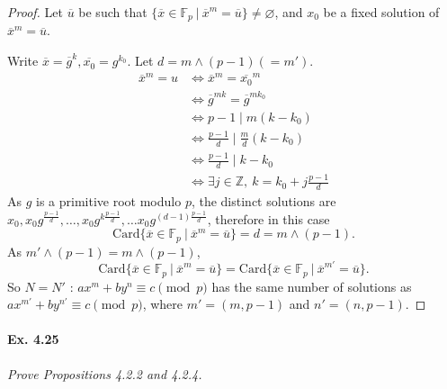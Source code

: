 \documentclass[11pt,a4paper]{article}
\newcommand{\Z}{\mathbb{Z}}
\newcommand{\F}{\mathbb{F}}
\begin{document}
\begin{proof}
Let $\overline{u}$ be such that $\{\overline{x} \in \F_p\ \vert\  \overline{x}^m  = \overline{u}\} \ne \varnothing$, and $x_0$ be a fixed solution of $\overline{x}^m  = \overline{u}$.

Write $\overline{x} = \overline{g}^k, \overline{x_0} = g^{k_0}$. Let $d = m\wedge (p-1) (=m')$.
\begin{align*}
\overline{x}^m = u &\iff \overline{x}^m = \overline{x_0}^m\\
&\iff \overline{g}^{mk} = \overline{g}^{mk_0}\\
&\iff  p-1 \mid m(k -k_0)\\
&\iff \frac{p-1}{d} \mid \frac{m}{d} (k-k_0)\\
&\iff \frac{p-1}{d} \mid k-k_0\\
&\iff \exists j \in \Z,\ k = k_0 + j \frac{p-1}{d} 
\end{align*}
As $g$ is a primitive root modulo $p$, the distinct solutions are $x_0, x_0 g^{\frac{p-1}{d} },\ldots, x_0g^{k\frac{p-1}{d}}, \ldots x_0g^{ (d-1)\frac {p-1}{d}}$, therefore in this case
$$\mathrm{Card}\{\overline{x} \in \F_p\ \vert\  \overline{x}^m  = \overline{u}\} = d = m\wedge(p-1).$$
As $m'\wedge (p-1) = m\wedge (p-1)$,
$$\mathrm{Card}\{\overline{x} \in \F_p\ \vert\  \overline{x}^m  = \overline{u}\} = \mathrm{Card}\{\overline{x} \in \F_p\ \vert \ \overline{x}^{m'} = \overline{u}\}.$$ 
So $N=N'$ : $a x^m + b y^n \equiv c \pmod p$ has the same number of solutions as $a x^{m'} + b y^{n'} \equiv c \pmod p$, where $m' = (m,p-1)$ and $n' = (n, p-1)$.
\end{proof}

\paragraph{Ex. 4.25}

{\it Prove Propositions 4.2.2 and 4.2.4.
}

\medskip 
\end{document}
